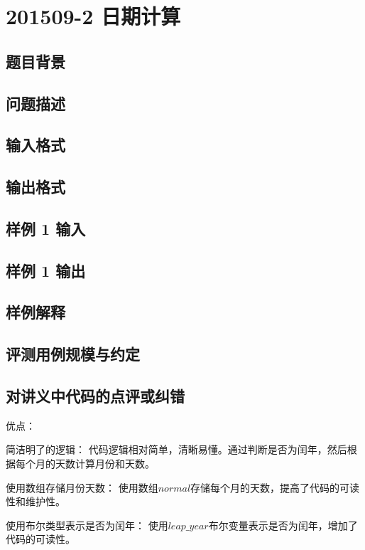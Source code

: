 \section{201509-2 日期计算}

\subsection{题目背景}

\subsection{问题描述}

\subsection{输入格式}

\subsection{输出格式}

\subsection{样例 1 输入}

\subsection{样例 1 输出}

\subsection{样例解释}

\subsection{评测用例规模与约定}

\subsection{对讲义中代码的点评或纠错}
 
优点：

简洁明了的逻辑： 代码逻辑相对简单，清晰易懂。通过判断是否为闰年，然后根据每个月的天数计算月份和天数。

使用数组存储月份天数： 使用数组$normal$存储每个月的天数，提高了代码的可读性和维护性。

使用布尔类型表示是否为闰年： 使用$leap\_year$布尔变量表示是否为闰年，增加了代码的可读性。

